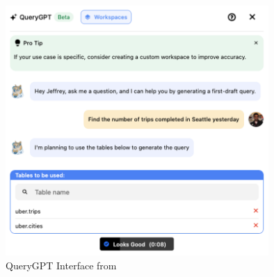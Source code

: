         \begin{figure}[H]
            \centering
            \includegraphics[width=10cm]{chapters/2/figures/query-gpt-ui.png}
            \caption[QueryGPT Interface]{QueryGPT Interface  from~\cite{QueryGPT}}
            \label{fig:query-gpt-interface}
        \end{figure}

